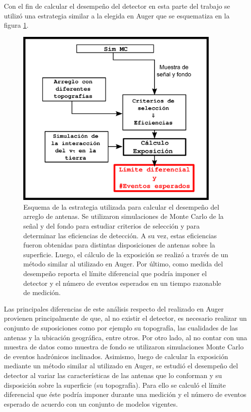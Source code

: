 Con el fin de calcular el desempe\~no del detector en esta parte del trabajo se utiliz\'o una estrategia similar a la elegida en Auger que se esquematiza en la figura \ref{fig:analysisSchemaRadio}.
%
\begin{figure}[h!]
	\begin{center}
		\includegraphics[width=0.9\textwidth]{fig/motivacionRadio/analysisSchemaRadio_v2}
		\caption{Esquema de la estrategia utilizada para calcular el desempe\~no del arreglo de antenas. Se utilizaron simulaciones de Monte Carlo de la se\~nal y del fondo para estudiar criterios de selecci\'on y para determinar las eficiencias de detecci\'on. A su vez, estas eficiencias fueron obtenidas para distintas disposiciones de antenas sobre la superficie. Luego, el c\'alculo de la exposici\'on se realiz\'o a trav\'es de un m\'etodo similar al utilizado en Auger. Por \'ultimo, como medida del desempe\~no reporta el l\'imite diferencial que podr\'ia imponer el detector y el n\'umero de eventos esperados en un tiempo razonable de medici\'on.}
		\label{fig:analysisSchemaRadio}
	\end{center}
\end{figure}
%
Las principales diferencias de este an\'alisis respecto del realizado en Auger provienen principalmente de que, al no existir el detector, es necesario realizar un conjunto de suposiciones como por ejemplo su topograf\'ia, las cualidades de las antenas y la ubicaci\'on geogr\'afica, entre otros.
Por otro lado, al no contar con una muestra de datos como muestra de fondo se utilizaron simulaciones Monte Carlo de eventos hadr\'onicos inclinados.
Asimismo, luego de calcular la exposici\'on mediante un m\'etodo similar al utilizado en Auger, se estudi\'o el desempe\~no del detector al variar las caracter\'isticas de las antenas que lo conforman y su disposici\'on sobre la superficie (su topograf\'ia).
Para ello se calcul\'o el l\'imite diferencial que \'este podr\'ia imponer durante una medici\'on y el n\'umero de eventos esperado de acuerdo con un conjunto de modelos vigentes.

